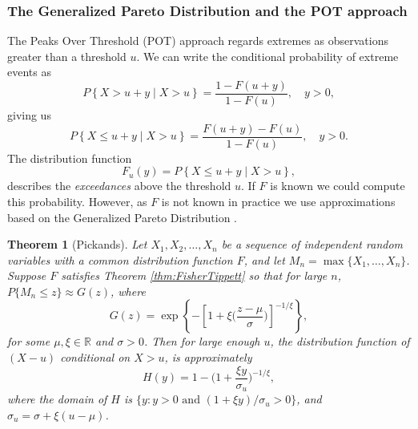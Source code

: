 \documentclass[11pt,a4paper,]{article}
\newtheorem{theorem}{Theorem}[section]
\theoremstyle{definition}
\theoremstyle{definition}
\theoremstyle{definition}
\theoremstyle{remark}
\begin{document}
\hypertarget{the-generalized-pareto-distribution-and-the-pot-approach}{%
\subsubsection*{The Generalized Pareto Distribution and the POT approach}\label{the-generalized-pareto-distribution-and-the-pot-approach}}

The Peaks Over Threshold (POT) approach regards extremes as observations greater than a threshold \(u\). We can write the conditional probability of extreme events as
\begin{equation}\label{eq:POT1}
    P\left \{X > u + y \mid X > u \right \} = \frac{1 - F(u+y)}{1 - F(u)} , \quad y >0  ,
\end{equation}
giving us
\begin{equation}\label{eq:POT2}
    P\left \{X \leq u + y \mid X > u \right \} = \frac{ F(u+y) - F(u)}{1 - F(u)} , \quad y >0  .
\end{equation}
The distribution function
\begin{equation}\label{eq:POT3}
    F_u(y) = P\left \{X \leq u + y \mid X > u \right \} ,
\end{equation}
describes the \emph{exceedances} above the threshold \(u\). If \(F\) is known we could compute this probability. However, as \(F\) is not known in practice we use approximations based on the Generalized Pareto Distribution \autocite{Pickands1975}.

\begin{theorem}[Pickands]
  Let $X_1,  X_2, \dots,  X_n$ be a sequence of independent random variables with a common distribution function $F$, and let $M_n = \max \{X_1, \dots, X_n \}$. Suppose $F$ satisfies Theorem \ref{thm:FisherTippett} so that for large $n$, $P\{ M_n \leq z \} \approx G(z)$, where
    $$
    G(z) = \exp\left\{ -\left[ 1 + \xi\Big(\frac{z - \mu}{\sigma} \Big)\right]^{-1/\xi} \right\},
  $$
    for some $\mu, \xi \in \mathbb{R}$ and $\sigma >0$. Then for large enough $u$, the distribution function of $(X-u)$ conditional on $X > u$, is approximately
    \begin{equation}\label{eq:POT4}
        H(y) = 1 - \Big( 1 + \frac{\xi y}{\sigma_u} \Big)^{-1/\xi} ,
    \end{equation}
    where the domain of $H$ is $\{y: y >0 \text{~and~} (1 + \xi y)/\sigma_u >0 \}$, and $\sigma_u = \sigma + \xi(u- \mu)$.
\end{theorem}
\end{document}
